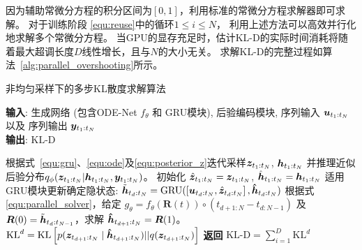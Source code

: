 因为辅助常微分方程的积分区间为$[0,1]$，利用标准的常微分方程求解器即可求解。
对于训练阶段
\eqref{equ:reuse}中的循环$1\leq i\leq N$，
利用上述方法可以高效并行化地求解多个常微分方程。
当GPU的显存充足时，估计KL-D的实际时间消耗将随着最大超调长度$D$线性增长，且与$N$的大小无关。
求解KL-D的完整过程如算法~\ref{alg:parallel_overshooting}所示。
\begin{algorithm}[tb]
    \caption{非均匀采样下的多步KL散度求解算法}
    \label{alg:parallel_overshooting}
    \textbf{输入}: 生成网络 (包含ODE-Net $f_\theta$ 和 GRU模块), 后验编码模块, 序列输入 $\boldsymbol u_{t_1:t_N}$ 以及 序列输出 $\boldsymbol y_{t_1:t_N}$\\
    \textbf{输出}: $\text{KL-D}$ 
    \begin{algorithmic}[1] %
    \State 根据式~\eqref{equ:gru}、\eqref{equ:ode}及\eqref{equ:posterior_z}迭代采样$\boldsymbol{z}_{t_1:t_N}$, $\boldsymbol{{h}}_{t_1:t_N}$ 并推理近似后验分布$q_{\phi}(\boldsymbol z_{t_1:t_N}|\boldsymbol h_{t_1:t_N}, \boldsymbol y_{t_1:t_N})$。
    \State 初始化 $\hat{\boldsymbol{z}}_{t_1:t_N}=\boldsymbol{z}_{t_1:t_N}$, $\hat{\boldsymbol{h}}_{t_1:t_N}=\boldsymbol{h}_{t_1:t_N}$
    \State 适用GRU模块更新确定隐状态: 
    $\tilde{\boldsymbol{h}}_{t_d:t_N}=\text{GRU}(\left [\boldsymbol{u}_{t_d:t_N}, \hat{\boldsymbol{z}}_{t_d:t_N}\right], \boldsymbol{{\hat h}}_{t_d:t_N})$
    \State 根据式\eqref{equ:parallel_solver}，给定 $g_{\theta}=f_{\theta}(\boldsymbol{R}(t)) \circ\left(t_{d+1:N}-t_{d:N-1}\right)$ 及 $\boldsymbol{R}(0)=\tilde{\boldsymbol{h}}_{t_d:t_{N-1}}$，求解 $\boldsymbol{{\hat h}}_{t_{d+1}:t_{N}}=\boldsymbol{R}(1)$。
    \State $\text{KL}^d= \text{KL}\left[p(\boldsymbol{z}_{t_{d+1}:t_{N}}\mid \boldsymbol{{\hat h}}_{t_{d+1}:t_{N}})||q(\boldsymbol{z}_{t_{d+1}:t_N})\right]$
    \EndFor
    \State \textbf{返回} $\text{KL-D} = \sum_{i=1}^{D}\text{KL}^d$ 
    \end{algorithmic}
    \end{algorithm}

